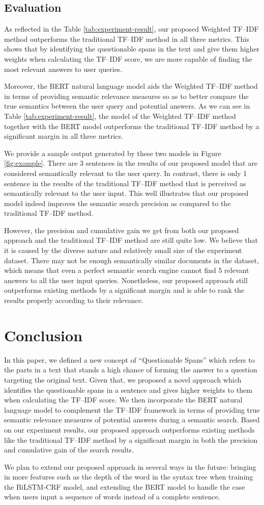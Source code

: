 \subsection{Evaluation}
As reflected in the Table \ref{tab:experiment-result}, our proposed Weighted TF--IDF method outperforms the traditional TF--IDF method in all three metrics. This shows that by identifying the questionable spans in the text and give them higher weights when calculating the TF--IDF score, we are more capable of finding the most relevant answers to user queries.

Moreover, the BERT natural language model aids the Weighted TF--IDF method in terms of providing semantic relevance measures so as to better compare the true semantics between the user query and potential answers. As we can see in Table \ref{tab:experiment-result}, the model of the Weighted TF--IDF method together with the BERT model outperforms the traditional TF--IDF method by a significant margin in all three metrics.

We provide a sample output generated by these two models in Figure \ref{fig:example}. There are 3 sentences in the results of our proposed model that are considered semantically relevant to the user query. In contrast, there is only 1 sentence in the results of the traditional TF--IDF method that is perceived as semantically relevant to the user input. This well illustrates that our proposed model indeed improves the semantic search precision as compared to the traditional TF--IDF method.

However, the precision and cumulative gain we get from both our proposed approach and the traditional TF--IDF method are still quite low. We believe that it is caused by the diverse nature and relatively small size of the experiment dataset. There may not be enough semantically similar documents in the dataset, which means that even a perfect semantic search engine cannot find 5 relevant answers to all the user input queries. Nonetheless, our proposed approach still outperforms existing methods by a significant margin and is able to rank the results properly according to their relevance.

\section{Conclusion} \label{sec:conclusion}
In this paper, we defined a new concept of ``Questionable Spans'' which refers to the parts in a text that stands a high chance of forming the answer to a question targeting the original text. Given that, we proposed a novel approach which identifies the questionable spans in a sentence and gives higher weights to them when calculating the TF--IDF score. We then incorporate the BERT natural language model to complement the TF--IDF framework in terms of providing true semantic relevance measures of potential answers during a semantic search. Based on our experiment results, our proposed approach outperforms existing methods like the traditional TF--IDF method by a significant margin in both the precision and cumulative gain of the search results.

We plan to extend our proposed approach in several ways in the future: bringing in more features such as the depth of the word in the syntax tree when training the BiLSTM-CRF model, and extending the BERT model to handle the case when users input a sequence of words instead of a complete sentence.

